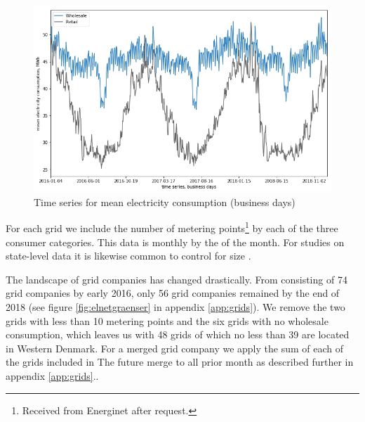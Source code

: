 \begin{figure}[H]
  \centering
  \caption{Time series for mean electricity consumption (business days)}
  \label{fig:cons_time_series}
  \includegraphics[width=1 \textwidth]{03_figures/cons_time series, business days}
\end{figure}
For each grid we include the number of metering points\footnote{Received from Energinet after request.} by each of the three consumer categories.  This data is monthly by the  of the month. For studies on state-level data it is likewise common to control for size \citep{burke2017price}.
\bigskip\par
The landscape of grid companies has changed drastically. From consisting of 74 grid companies by early 2016, only 56 grid companies remained by the end of 2018 (see figure \ref{fig:elnetgraenser} in appendix \ref{app:grids}). We remove the two grids with less than 10 metering points and the six grids with no wholesale consumption, which leaves us with 48 grids of which no less than 39 are located in Western Denmark. For a merged grid company we apply the sum of each of the grids included in The future merge to all prior month as described further in appendix \ref{app:grids}..


